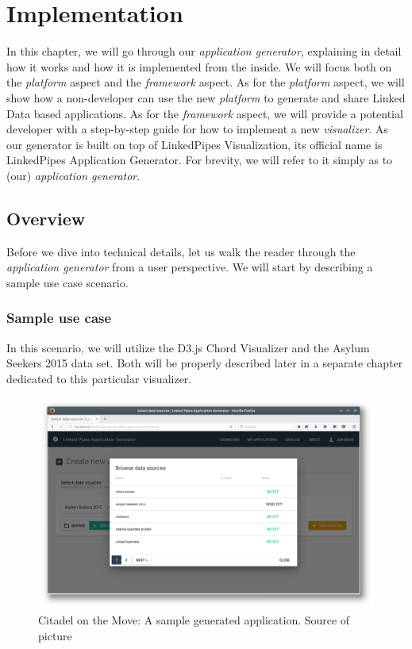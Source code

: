 \chapter{Implementation}

In this chapter, we will go through our \emph{application generator}, explaining in detail how it works and how it is implemented from the inside. We will focus both on the \emph{platform} aspect and the \emph{framework} aspect. As for the \emph{platform} aspect, we will show how a non-developer can use the new \emph{platform} to generate and share Linked Data based applications. As for the \emph{framework} aspect, we will provide a potential developer with a step-by-step guide for how to implement a new \emph{visualizer}. As our generator is built on top of LinkedPipes Visualization, its official name is LinkedPipes Application Generator. For brevity, we will refer to it simply as to (our) \emph{application generator}. 

\section{Overview}

Before we dive into technical details, let us walk the reader through the \emph{application generator} from a user perspective. We will start by describing a sample use case scenario.

\subsection{Sample use case}

In this scenario, we will utilize the D3.js Chord Visualizer and the Asylum Seekers 2015 data set. Both will be properly described later in a separate chapter dedicated to this particular visualizer.


\begin{figure}
	\centering
	\includegraphics[width=145mm]{img/05_scenario_01_browse_data_sources.png}
	\caption{Citadel on the Move: A sample generated application. Source of picture \cite{citadel_agt_doc}}
	\label{fig:scenario-01-browse-data-sources}
\end{figure}

